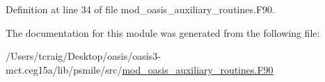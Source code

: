 Definition at line 34 of file mod\+\_\+oasis\+\_\+auxiliary\+\_\+routines.\+F90.



The documentation for this module was generated from the following file\+:\begin{DoxyCompactItemize}
\item 
/\+Users/tcraig/\+Desktop/oasis/oasis3-\/mct.\+ceg15a/lib/psmile/src/\hyperlink{mod__oasis__auxiliary__routines_8_f90}{mod\+\_\+oasis\+\_\+auxiliary\+\_\+routines.\+F90}\end{DoxyCompactItemize}
